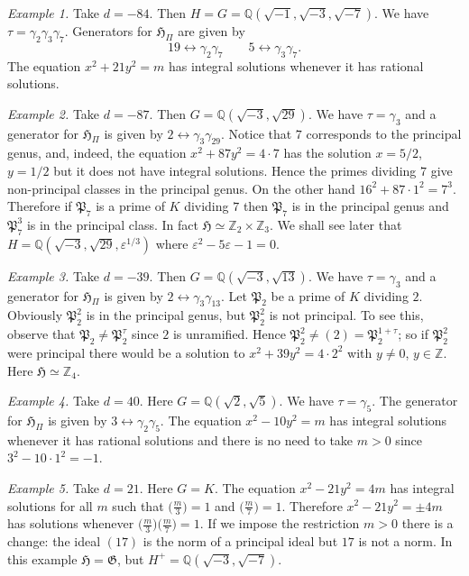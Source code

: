 \medskip\noindent
\emph{Example 1.} Take $d=-84$. Then $H=G=\mathbb{Q}(\sqrt{-1},
\sqrt{-3},\sqrt{-7})$. We have $\tau=\gamma_{2}\gamma_{3}\gamma_{7}$.
Generators for $\mathfrak{H}_{\Pi}$ are given by
\[
19\leftrightarrow\gamma_{2}\gamma_{7}\qquad
5\leftrightarrow\gamma_{3}\gamma_{7}.
\]
The equation $x^{2}+21y^{2}=m$ has integral solutions whenever it has
rational solutions.

\medskip\noindent
\emph{Example 2.} Take $d=-87$. Then
$G=\mathbb{Q}(\sqrt{-3},\sqrt{29})$. We have $\tau=\gamma_{3}$ and a
generator for $\mathfrak{H}_{\Pi}$ is given by
$2\leftrightarrow\gamma_{3}\gamma_{29}$. Notice that $7$ corresponds to
the principal genus, and, indeed, the equation $x^{2}+87y^{2}=4\cdot 7$
has the solution $x=5/2$, $y=1/2$ but it does not have integral
solutions. Hence the primes dividing $7$ give non-principal classes in
the principal genus. On the other hand $16^{2}+87\cdot 1^{2}=7^{3}$.
Therefore if $\mathfrak{P}_{7}$ is a prime of $K$ dividing $7$ then
$\mathfrak{P}_{7}$ is in the principal genus and $\mathfrak{P}_{7}^{3}$
is in the principal class. In fact
$\mathfrak{H}\simeq\mathbb{Z}_{2}\times\mathbb{Z}_{3}$. We shall see
later that $H=\mathbb{Q}(\sqrt{-3},\sqrt{29},\varepsilon^{1/3})$ where
$\varepsilon^{2}-5\varepsilon-1=0$.

\medskip\noindent
\emph{Example 3.} Take $d=-39$. Then $G=\mathbb{Q}(\sqrt{-3},
\sqrt{13})$. We have $\tau=\gamma_{3}$ and a generator for
$\mathfrak{H}_{\Pi}$ is given by $2\leftrightarrow\gamma_{3}\gamma_{13}$.
Let $\mathfrak{P}_{2}$ be a prime of $K$ dividing $2$. Obviously
$\mathfrak{P}_{2}^{2}$ is in the principal genus, but $\mathfrak{P}_{2}^{2}$
is not principal. To see this, observe that
$\mathfrak{P}_{2}\neq\mathfrak{P}_{2}^{\tau}$ since $2$ is unramified.
Hence $\mathfrak{P}_{2}^{2}\neq(2)=\mathfrak{P}_{2}^{1+\tau}$; so if
$\mathfrak{P}_{2}^{2}$ were principal there would be a solution to
$x^{2}+39y^{2}=4\cdot 2^{2}$ with $y\neq 0$, $y\in\mathbb{Z}$. Here
$\mathfrak{H}\simeq\mathbb{Z}_{4}$.

\medskip\noindent
\emph{Example 4.} Take $d=40$. Here $G=\mathbb{Q}(\sqrt{2},\sqrt{5})$.
We have $\tau=\gamma_{5}$. The generator for $\mathfrak{H}_{\Pi}$ is
given by $3\leftrightarrow\gamma_{2}\gamma_{5}$. The equation
$x^{2}-10y^{2}=m$ has integral solutions whenever it has rational
solutions and there is no need to take $m>0$ since
$3^{2}-10\cdot 1^{2}=-1$.

\medskip\noindent
\emph{Example 5.} Take $d=21$. Here $G=K$. The equation
$x^{2}-21y^{2}=4m$ has integral solutions for all $m$ such that
$\bigl(\frac{m}{3}\bigr)=1$ and $\bigl(\frac{m}{7}\bigr)=1$. Therefore
$x^{2}-21y^{2}=\pm 4m$ has solutions whenever
$\bigl(\frac{m}{3}\bigr)\bigl(\frac{m}{7}\bigr)=1$. If we impose the
restriction $m>0$ there is a change: the ideal $(17)$ is the norm of a
principal ideal but $17$ is not a norm. In this example
$\mathfrak{H}=\mathfrak{G}$, but
$H^{+}=\mathbb{Q}(\sqrt{-3},\sqrt{-7})$.

